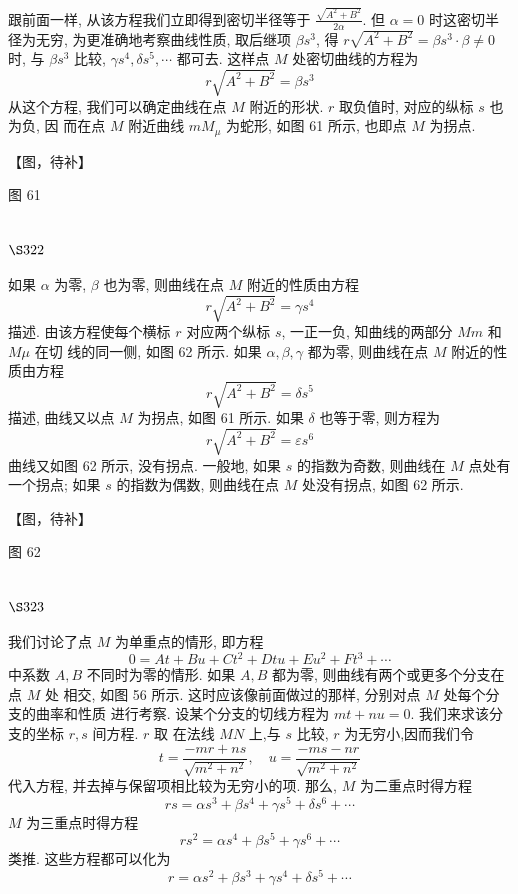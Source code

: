 跟前面一样, 从该方程我们立即得到密切半径等于 $\frac{\sqrt{A^{2}+B^{2}}}{2 \alpha}$. 但 $\alpha=0$ 时这密切半 径为无穷, 为更准确地考察曲线性质, 取后继项 $\beta s^{3}$, 得 $r \sqrt{A^{2}+B^{2}}=\beta s^{3} \cdot \beta \neq 0$ 时, 与 $\beta s^{3}$ 比较, $\gamma s^{4}, \delta s^{5}, \cdots$ 都可去. 这样点 $M$ 处密切曲线的方程为
\[
r \sqrt{A^{2}+B^{2}}=\beta s^{3}
\]
从这个方程, 我们可以确定曲线在点 $M$ 附近的形状. $r$ 取负值时, 对应的纵标 $s$ 也为负, 因 而在点 $M$ 附近曲线 $m M_{\mu}$ 为蛇形, 如图 61 所示, 也即点 $M$ 为拐点.


【图，待补】

图 61

\section{$\S 322$}

如果 $\alpha$ 为零, $\beta$ 也为零, 则曲线在点 $M$ 附近的性质由方程
\[
r \sqrt{A^{2}+B^{2}}=\gamma s^{4}
\]
描述. 由该方程使每个横标 $r$ 对应两个纵标 $s$, 一正一负, 知曲线的两部分 $M m$ 和 $M \mu$ 在切 线的同一侧, 如图 62 所示. 如果 $\alpha, \beta, \gamma$ 都为零, 则曲线在点 $M$ 附近的性质由方程
\[
r \sqrt{A^{2}+B^{2}}=\delta s^{5}
\]
描述, 曲线又以点 $M$ 为拐点, 如图 61 所示. 如果 $\delta$ 也等于零, 则方程为
\[
r \sqrt{A^{2}+B^{2}}=\varepsilon s^{6}
\]
曲线又如图 62 所示, 没有拐点. 一般地, 如果 $s$ 的指数为奇数, 则曲线在 $M$ 点处有一个拐点; 如果 $s$ 的指数为偶数, 则曲线在点 $M$ 处没有拐点, 如图 62 所示.


【图，待补】

图 62

\section{$\S 323$}

我们讨论了点 $M$ 为单重点的情形, 即方程
\[
0=A t+B u+C t^{2}+D t u+E u^{2}+F t^{3}+\cdots
\]
中系数 $A, B$ 不同时为零的情形. 如果 $A, B$ 都为零, 则曲线有两个或更多个分支在点 $M$ 处 相交, 如图 56 所示. 这时应该像前面做过的那样, 分别对点 $M$ 处每个分支的曲率和性质 进行考察. 设某个分支的切线方程为 $m t+n u=0$. 我们来求该分支的坐标 $r, s$ 间方程. $r$ 取 在法线 $M N$ 上,与 $s$ 比较, $r$ 为无穷小,因而我们令
\[
t=\frac{-m r+n s}{\sqrt{m^{2}+n^{2}}}, \quad u=\frac{-m s-n r}{\sqrt{m^{2}+n^{2}}}
\]
代入方程, 并去掉与保留项相比较为无穷小的项. 那么, $M$ 为二重点时得方程
\[
r s=\alpha s^{3}+\beta s^{4}+\gamma s^{5}+\delta s^{6}+\cdots
\]
$M$ 为三重点时得方程
\[
r s^{2}=\alpha s^{4}+\beta s^{5}+\gamma s^{6}+\cdots
\]
类推. 这些方程都可以化为
\[
r=\alpha s^{2}+\beta s^{3}+\gamma s^{4}+\delta s^{5}+\cdots
\]
